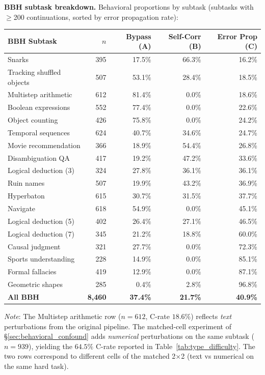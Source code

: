 \documentclass[10pt]{article} %
\begin{document}
\vspace{0.5em}
\textbf{BBH subtask breakdown.} Behavioral proportions by subtask (subtasks with $\geq$200 continuations, sorted by error propagation rate):

\begin{center}
\scriptsize
\begin{tabular}{lrrrr}
\toprule
\textbf{BBH Subtask} & \textbf{$n$} & \textbf{Bypass (A)} & \textbf{Self-Corr (B)} & \textbf{Error Prop (C)} \\
\midrule
Snarks & 395 & 17.5\% & 66.3\% & 16.2\% \\
Tracking shuffled objects & 507 & 53.1\% & 28.4\% & 18.5\% \\
Multistep arithmetic & 612 & 81.4\% & 0.0\% & 18.6\% \\
Boolean expressions & 552 & 77.4\% & 0.0\% & 22.6\% \\
Object counting & 426 & 75.8\% & 0.0\% & 24.2\% \\
Temporal sequences & 624 & 40.7\% & 34.6\% & 24.7\% \\
Movie recommendation & 366 & 18.9\% & 54.4\% & 26.8\% \\
Disambiguation QA & 417 & 19.2\% & 47.2\% & 33.6\% \\
Logical deduction (3) & 324 & 27.8\% & 36.1\% & 36.1\% \\
Ruin names & 507 & 19.9\% & 43.2\% & 36.9\% \\
Hyperbaton & 615 & 30.7\% & 31.5\% & 37.7\% \\
Navigate & 618 & 54.9\% & 0.0\% & 45.1\% \\
Logical deduction (5) & 402 & 26.4\% & 27.1\% & 46.5\% \\
Logical deduction (7) & 345 & 21.2\% & 18.8\% & 60.0\% \\
Causal judgment & 321 & 27.7\% & 0.0\% & 72.3\% \\
Sports understanding & 228 & 14.9\% & 0.0\% & 85.1\% \\
Formal fallacies & 419 & 12.9\% & 0.0\% & 87.1\% \\
Geometric shapes & 285 & 0.4\% & 2.8\% & 96.8\% \\
\midrule
\textbf{All BBH} & \textbf{8,460} & \textbf{37.4\%} & \textbf{21.7\%} & \textbf{40.9\%} \\
\bottomrule
\end{tabular}
\end{center}

{\noindent\footnotesize\emph{Note}: The Multistep arithmetic row ($n = 612$, C-rate $18.6\%$) reflects \emph{text} perturbations from the original pipeline. The matched-cell experiment of \S\ref{sec:behavioral_confound} adds \emph{numerical} perturbations on the same subtask ($n = 939$), yielding the $64.5\%$ C-rate reported in Table~\ref{tab:type_difficulty}. The two rows correspond to different cells of the matched 2$\times$2 (text vs numerical on the same hard task).\par}
\end{document}
